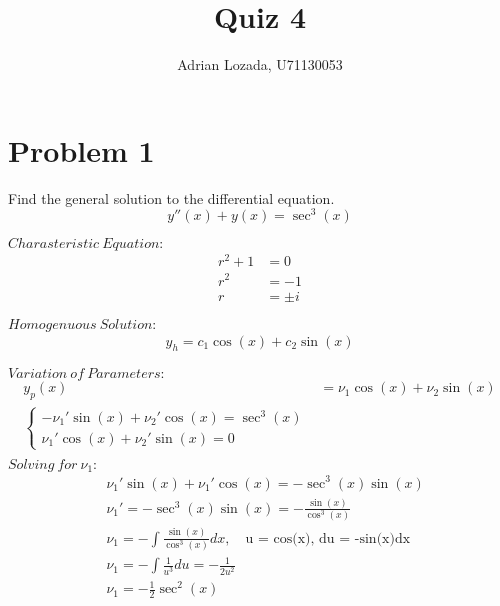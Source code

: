 \documentclass{article}
\author{Adrian Lozada, U71130053}
\title{Quiz 4}
\begin{document}
    \maketitle
    \newpage

    \section{Problem 1}

    \begin{flushleft}
        Find the general solution to the differential equation. \\
        $$y''(x) + y(x) = \sec^{3}(x)$$
    \end{flushleft}
    $Charasteristic\ Equation:$ \\
    \begin{align*}
        r^{2} + 1 &= 0 \\
        r^{2} &= -1 \\
        r &= \pm i
    \end{align*}

    $Homogenuous\ Solution:$ \\
    \begin{align*}
        y_h = c_{1}\cos(x) + c_{2}\sin(x)
    \end{align*}

    $Variation\ of\ Parameters:$ \\
    \begin{align*}
        y_p(x) &= \nu_1\cos(x) + \nu_2\sin(x) \\
        \begin{cases}
            -\nu_1'\sin(x) + \nu_2'\cos(x) = \sec^{3}(x) \\
            \nu_1'\cos(x) + \nu_2'\sin(x) = 0
        \end{cases}
        \\
    \end{align*}
    $Solving\ for\ \nu_1:$ \\
    \begin{align*}
        &\nu_1'\sin(x) + \nu_1'\cos(x)  = -\sec^{3}(x)\sin(x) \\
        &\nu_1' = -\sec^{3}(x)\sin(x) = -\frac{\sin(x)}{\cos^{3}(x)}\\
        &\nu_1 = -\int \frac{\sin(x)}{\cos^{3}(x)} dx, \quad \text{u = cos(x), du = -sin(x)dx} \\
        &\nu_1 = - \int \frac{1}{u^{3}}du = -\frac{1}{2u^{2}} \\
        &\nu_1 = -\frac{1}{2}\sec^{2}(x) \\
    \end{align*}
\end{document}
